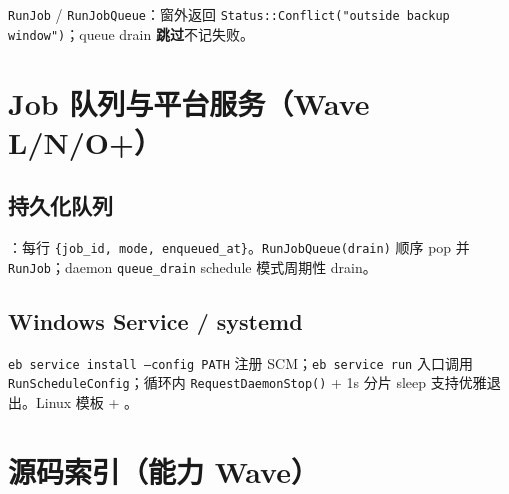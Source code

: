 \texttt{RunJob} / \texttt{RunJobQueue}：窗外返回 \texttt{Status::Conflict("outside backup window")}；queue drain \textbf{跳过}不记失败。

\section{Job 队列与平台服务（Wave L/N/O+）}

\subsection{持久化队列}

：每行 \texttt{\{job\_id, mode, enqueued\_at\}}。\texttt{RunJobQueue(drain)} 顺序 pop 并 \texttt{RunJob}；daemon \texttt{queue\_drain} schedule 模式周期性 drain。

\subsection{Windows Service / systemd}

\texttt{eb service install --config PATH} 注册 SCM；\texttt{eb service run} 入口调用 \texttt{RunScheduleConfig}；循环内 \texttt{RequestDaemonStop()} + 1s 分片 sleep 支持优雅退出。Linux 模板  + 。

\section{源码索引（能力 Wave）}

